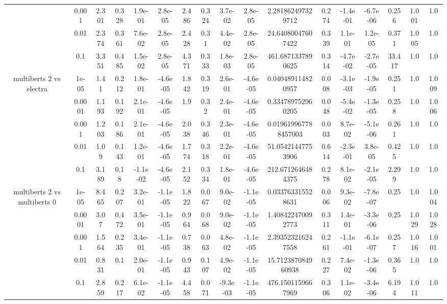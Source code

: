 \begin{tabular}{|c|c|c|c|c|c|c|c|c|c|c|c|c|c|c|c|c|}
 & 0.001 & 2.301 & 0.328 & 1.9e-01 & 2.8e-05 & 2.486 & 0.324 & 3.7e-02 & 2.8e-05 & 2.281862497329712 & 0.274 & -1.4e-01 & -6.7e-06 & 0.256 & 1.001 & 1.0 \\
 & 0.01 & 2.374 & 0.361 & 7.6e-02 & 2.8e-05 & 2.428 & 0.31 & 4.4e-02 & 2.8e-05 & 24.64080047607422 & 0.339 & 1.1e-01 & 1.2e-05 & 0.371 & 1.005 & 1.0 \\
 & 0.1 & 3.351 & 0.485 & 1.5e-02 & 2.8e-05 & 4.371 & 0.333 & 1.8e-03 & 2.8e-05 & 461.6871337890625 & 0.314 & -4.7e-02 & -2.7e-05 & 33.417 & 1.0 & 1.0 \\
\hline
\multirow{5}{*}{multiberts 2 vs electra } & 1e-05 & 1.41 & 0.212 & 1.8e-01 & -4.6e-05 & 1.842 & 0.319 & 2.6e-01 & -4.6e-05 & 0.040489114820957 & 0.008 & -3.1e-03 & -1.9e-05 & 0.251 & 1.0 & 1.009 \\
 & 0.0001 & 1.193 & 0.192 & 2.1e-01 & -4.6e-05 & 1.9 & 0.32 & 2.4e-01 & -4.6e-05 & 0.334789752960205 & 0.048 & -5.4e-02 & -1.3e-05 & 0.258 & 1.0 & 1.006 \\
 & 0.001 & 1.203 & 0.186 & 2.1e-01 & -4.6e-05 & 2.038 & 0.346 & 2.3e-01 & -4.6e-05 & 0.019619967788457003 & 0.003 & 8.7e-02 & -5.1e-06 & 0.261 & 1.0 & 1.0 \\
 & 0.01 & 1.09 & 0.143 & 1.2e-01 & -4.6e-05 & 1.774 & 0.318 & 2.2e-01 & -4.6e-05 & 51.05421447753906 & 0.614 & -2.3e-01 & 3.8e-05 & 0.425 & 1.0 & 1.0 \\
 & 0.1 & 3.189 & 0.18 & -1.1e-02 & -4.6e-05 & 2.152 & 0.334 & 1.8e-01 & -4.6e-05 & 212.6712646484375 & 0.278 & 8.1e-02 & -2.1e-05 & 2.299 & 1.0 & 1.0 \\
\hline
\multirow{5}{*}{multiberts 2 vs multiberts 0} & 1e-05 & 8.465 & 0.207 & 3.2e-01 & -1.1e-05 & 1.822 & 0.067 & 9.0e-02 & -1.1e-05 & 0.033763315528631 & 0.006 & 9.3e-02 & -7.8e-07 & 0.25 & 1.0 & 1.004 \\
 & 0.0001 & 3.07 & 0.472 & 3.5e-01 & -1.1e-05 & 0.964 & 0.068 & 9.0e-02 & -1.1e-05 & 1.408422470092773 & 0.311 & 1.4e-01 & -3.3e-06 & 0.25 & 1.029 & 1.028 \\
 & 0.001 & 1.564 & 0.235 & 3.4e-01 & -1.1e-05 & 0.738 & 0.063 & 4.8e-02 & -1.1e-05 & 2.393523216247558 & 0.261 & -1.1e-01 & -6.1e-07 & 0.257 & 1.016 & 1.001 \\
 & 0.01 & 0.831 & 0.1 & 2.0e-01 & -1.1e-05 & 0.943 & 0.107 & 4.9e-02 & -1.1e-05 & 15.712387084960938 & 0.227 & 7.4e-02 & -1.3e-06 & 0.365 & 1.0 & 1.0 \\
 & 0.1 & 2.859 & 0.217 & 6.1e-02 & -1.1e-05 & 4.458 & 0.071 & -9.3e-03 & -1.1e-05 & 476.1501159667969 & 0.306 & 1.1e-02 & -3.4e-06 & 6.194 & 1.011 & 1.0 \\

\end{tabular}

